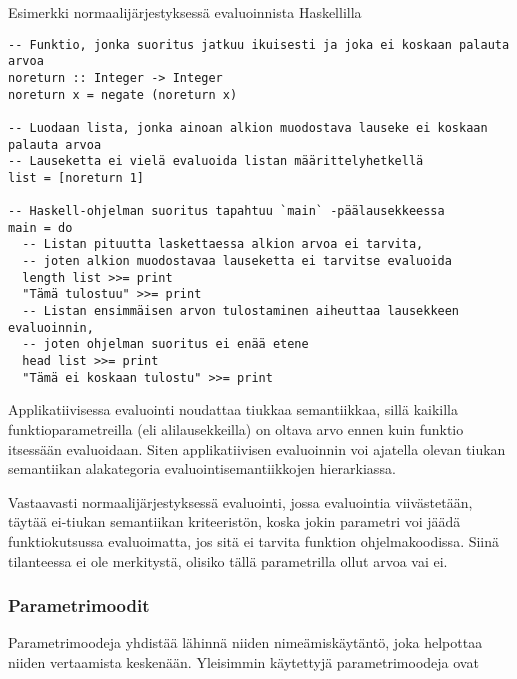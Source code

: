 \begin{listing}[H]
  \caption{Esimerkki normaalijärjestyksessä evaluoinnista Haskellilla}
  \label{codehaskellnormalorder}
  \bigskip
  \begin{verbatim}
-- Funktio, jonka suoritus jatkuu ikuisesti ja joka ei koskaan palauta arvoa
noreturn :: Integer -> Integer
noreturn x = negate (noreturn x)

-- Luodaan lista, jonka ainoan alkion muodostava lauseke ei koskaan palauta arvoa
-- Lauseketta ei vielä evaluoida listan määrittelyhetkellä
list = [noreturn 1]

-- Haskell-ohjelman suoritus tapahtuu `main` -päälausekkeessa
main = do
  -- Listan pituutta laskettaessa alkion arvoa ei tarvita,
  -- joten alkion muodostavaa lauseketta ei tarvitse evaluoida
  length list >>= print
  "Tämä tulostuu" >>= print
  -- Listan ensimmäisen arvon tulostaminen aiheuttaa lausekkeen evaluoinnin,
  -- joten ohjelman suoritus ei enää etene
  head list >>= print
  "Tämä ei koskaan tulostu" >>= print

  \end{verbatim}
\end{listing}

Applikatiivisessa evaluointi noudattaa tiukkaa semantiikkaa, sillä kaikilla funktioparametreilla (eli alilausekkeilla) on oltava arvo ennen kuin funktio itsessään evaluoidaan. Siten applikatiivisen evaluoinnin voi ajatella olevan tiukan semantiikan alakategoria evaluointisemantiikkojen hierarkiassa.

Vastaavasti normaalijärjestyksessä evaluointi, jossa evaluointia viivästetään, täytää ei-tiukan semantiikan kriteeristön, koska jokin parametri voi jäädä funktiokutsussa evaluoimatta, jos sitä ei tarvita funktion ohjelmakoodissa. Siinä tilanteessa ei ole merkitystä, olisiko tällä parametrilla ollut arvoa vai ei.


\subsubsection{Parametrimoodit}
Parametrimoodeja yhdistää lähinnä niiden nimeämiskäytäntö, joka helpottaa niiden vertaamista keskenään. Yleisimmin käytettyjä parametrimoodeja ovat

